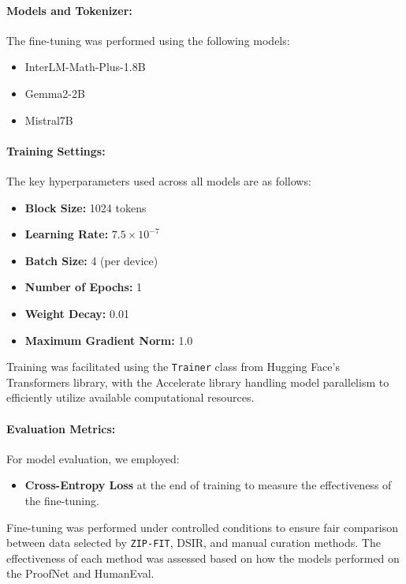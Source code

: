 \paragraph{Models and Tokenizer:}
The fine-tuning was performed using the following models:
\begin{itemize}
    \item InterLM-Math-Plus-1.8B
    \item Gemma2-2B
    \item Mistral7B
\end{itemize}

\paragraph{Training Settings:}
The key hyperparameters used across all models are as follows:
\begin{itemize}
    \item \textbf{Block Size:} 1024 tokens
    \item \textbf{Learning Rate:} $7.5 \times 10^{-7}$
    \item \textbf{Batch Size:} 4 (per device)
    \item \textbf{Number of Epochs:} 1
    \item \textbf{Weight Decay:} 0.01
    \item \textbf{Maximum Gradient Norm:} 1.0
\end{itemize}

Training was facilitated using the \texttt{Trainer} class from Hugging Face's Transformers library, with the Accelerate library handling model parallelism to efficiently utilize available computational resources.

\paragraph{Evaluation Metrics:}
For model evaluation, we employed:
\begin{itemize}
    \item \textbf{Cross-Entropy Loss} at the end of training to measure the effectiveness of the fine-tuning.
\end{itemize}

Fine-tuning was performed under controlled conditions to ensure fair comparison between data selected by \texttt{ZIP-FIT}, DSIR, and manual curation methods. The effectiveness of each method was assessed based on how the models performed on the ProofNet and HumanEval.

